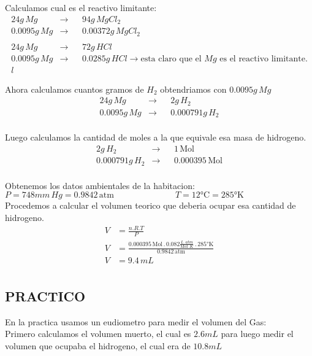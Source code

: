 \documentclass[12pt]{report}
\begin{document}
Calculamos cual es el reactivo limitante:\\

$$
\begin{aligned}
    24g \, Mg &\rightarrow&& 94g \, MgCl_2 \\[6pt]
    0.0095g \, Mg &\rightarrow&& 0.00372g \, MgCl_2\\[6pt]
    \\
    24g \, Mg &\rightarrow&& 72g \, HCl \\[6pt]
    0.0095g \, Mg &\rightarrow&& 0.0285g \, HCl \rightarrow \text{esta claro que el $Mg$ es el reactivo limitante.}\\[6pt]l
\end{aligned}
$$

Ahora calculamos cuantos gramos de $H_2$ obtendriamos con $0.0095g \, Mg$ \\

$$
\begin{aligned}
    24g \, Mg &\rightarrow&& 2g \, H_2 \\[6pt]
    0.0095g \, Mg &\rightarrow&& 0.000791g \, H_2\\[6pt]
\end{aligned}
$$

Luego calculamos la cantidad de moles a la que equivale esa masa de hidrogeno.\\

$$
\begin{aligned}
    2g \, H_2  &\rightarrow&& 1 \, \text{Mol} \\[6pt]
    0.000791g \, H_2 &\rightarrow&& 0.000395 \,\text{Mol}  \\[6pt]
\end{aligned}
$$

Obtenemos los datos ambientales de la habitacion:\\[6pt]
$P = 748mm \, Hg = 0.9842 \, \text{atm} \hspace{3cm} T= 12 \text{°C} = 285 \text{°K}$\\[6pt]
Procedemos a calcular el volumen teorico que deberia ocupar esa cantidad de hidrogeno.\\

$$
\begin{aligned}
    V&=\frac{n . R . T}{P}\\[6pt]
    V&=\frac{0.000395 \, \text{Mol}\, . \, 0.082 \frac{L \, . atm}{\text{Mol} \, . K} \, . \, 285 \text{°K}}{0.9842 \, \text{atm}}\\[6pt]
    V&=9.4 \, mL\\[6pt]
\end{aligned}
$$

\subsection{PRACTICO}

En la practica usamos un eudiometro para medir el volumen del Gas:\\

Primero calculamos el volumen muerto, el cual es $2.6mL$ para luego medir el volumen que ocupaba el hidrogeno, el cual era de $10.8mL$
\end{document}
